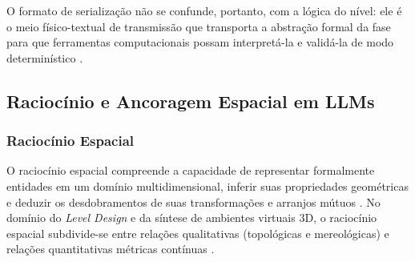O formato de serialização não se confunde, portanto, com a lógica do nível: ele é o meio físico-textual de transmissão que transporta a abstração formal da fase para que ferramentas computacionais possam interpretá-la e validá-la de modo determinístico \cite{tang2025unrealllm, xu2025databasedrivenframework3dlevel}.

\subsection{Raciocínio e Ancoragem Espacial em LLMs}
\label{sec:spatial_grounding}

\subsubsection{Raciocínio Espacial}
\label{sec:raciocinio_espacial}

O raciocínio espacial compreende a capacidade de representar formalmente entidades em um domínio multidimensional, inferir suas propriedades geométricas e deduzir os desdobramentos de suas transformações e arranjos mútuos \cite{cohn2008qualitative}. No domínio do \textit{Level Design} e da síntese de ambientes virtuais 3D, o raciocínio espacial subdivide-se entre relações qualitativas (topológicas e mereológicas) \cite{cohn2008qualitative} e relações quantitativas métricas contínuas \cite{xu2025constraint, chen2025narrative}.

